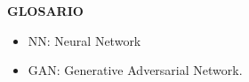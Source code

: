 {\thispagestyle{empty}\begin{center}%
		\bfseries GLOSARIO\end{center}}%
\begin{itemize}
	\item NN: Neural Network
	\item GAN: Generative Adversarial Network.
\end{itemize}

